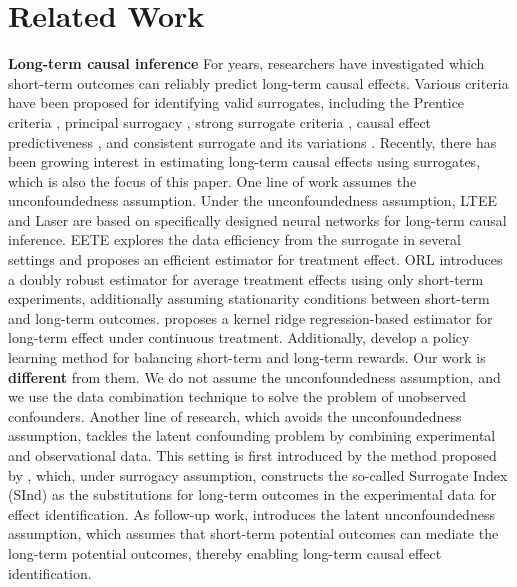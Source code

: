 \section{Related Work}
\label{related work}

\textbf{Long-term causal inference}
For years, researchers have investigated which short-term outcomes can reliably predict long-term causal effects.
Various criteria have been proposed for identifying valid surrogates, including the Prentice criteria \cite{prentice1989surrogate}, principal surrogacy \cite{frangakis2002principal}, strong surrogate criteria \cite{lauritzen2004discussion}, causal effect predictiveness \cite{gilbert2008evaluating}, and consistent surrogate and its variations \cite{chen2007criteria, ju2010criteria, yin2020novel}.
Recently, there has been growing interest in estimating long-term causal effects using surrogates, which is also the focus of this paper.
One line of work assumes the unconfoundedness assumption.
Under the unconfoundedness assumption, LTEE \cite{cheng2021long} and Laser \cite{cai2024long} are based on specifically designed neural networks for long-term causal inference.
EETE \cite{kallus2020role} explores the data efficiency from the surrogate in several settings and proposes an efficient estimator for treatment effect.
ORL \cite{tran2023inferring} introduces a doubly robust estimator for average treatment effects using only short-term experiments, additionally assuming stationarity conditions between short-term and long-term outcomes.
\citet{singh2024double} proposes a kernel ridge regression-based estimator for long-term effect under continuous treatment.
Additionally, \citet{wu2024policy} develop a policy learning method for balancing short-term and long-term rewards.
Our work is \textbf{different} from them. We do not assume the unconfoundedness assumption, and we use the data combination technique to solve the problem of unobserved confounders.
Another line of research, which avoids the unconfoundedness assumption, tackles the latent confounding problem by combining experimental and observational data.
This setting is first introduced by the method proposed by \citet{athey2019surrogate}, 
which, under surrogacy assumption, constructs the so-called Surrogate Index (SInd) as the substitutions for long-term outcomes in the experimental data for effect identification.
As follow-up work, \citet{athey2020combining} introduces the latent unconfoundedness assumption, which assumes that short-term potential outcomes can mediate the long-term potential outcomes,  thereby enabling long-term causal effect identification.
